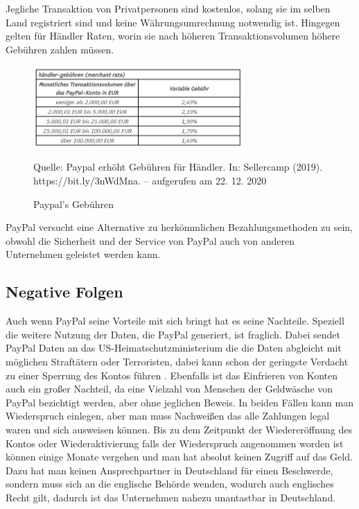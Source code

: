 \documentclass[a4paper, 12pt]{scrartcl}
\newcommand*{\bildquelle}{%
  \footnotesize Quelle:
}
\begin{document}
Jegliche Transaktion von Privatpersonen sind kostenlos, solang sie im selben Land registriert sind und keine Währungsumrechnung notwendig ist. Hingegen gelten für Händler Raten, worin sie nach höheren Transaktionsvolumen höhere Gebühren zahlen müssen.

\begin{figure}[h]
    \begin{center}
        \includegraphics[width=8cm]{media/paypal.png}
        \caption{Paypal's Gebühren}
        \label{gebühren-paypal}
        \bildquelle Paypal erhöht Gebühren für Händler. In: Sellercamp (2019). https://bit.ly/3nWdMna. – aufgerufen am 22. 12. 2020
    \end{center}
\end{figure}

\noindent PayPal versucht eine Alternative zu herkömmlichen Bezahlungsmethoden zu sein, obwohl die Sicherheit und der Service von PayPal auch von anderen Unternehmen geleistet werden kann.





        \subsection{Negative Folgen}
        
        
        
        
        
        Auch wenn PayPal seine Vorteile mit sich bringt hat es seine Nachteile. Speziell die weitere Nutzung der Daten, die PayPal generiert, ist fraglich. Dabei sendet PayPal Daten an das US-Heimatschutzministerium die die Daten abgleicht mit möglichen Straftätern oder Terroristen, dabei kann schon der geringste Verdacht zu einer Sperrung des Kontos führen \cite{paypal-sinn-unsinn}. Ebenfalls ist das Einfrieren von Konten auch ein großer Nachteil, da eine Vielzahl von Menschen der Geldwäsche von PayPal bezichtigt werden, aber ohne jeglichen Beweis. In beiden Fällen kann man Wiederspruch einlegen, aber man muss Nachweißen das alle Zahlungen legal waren und sich ausweisen können. Bis zu dem Zeitpunkt der Wiedereröffnung des Kontos oder Wiederaktivierung falls der Wiederspruch angenommen worden ist können einige Monate vergehen und man hat absolut keinen Zugriff auf das Geld. Dazu hat man keinen Ansprechpartner in Deutschland für einen Beschwerde, sondern muss sich an die englische Behörde wenden, wodurch auch englisches Recht gilt, dadurch ist das Unternehmen nahezu unantastbar in Deutschland. 
\end{document}
